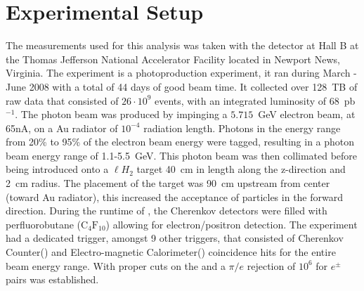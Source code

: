 \section{Experimental Setup}\label{sec:setup}
	The measurements used for this analysis was taken with the  detector at Hall B at the Thomas Jefferson National Accelerator Facility  located in 
	Newport News, Virginia. The  experiment is a photoproduction experiment, it ran during March - June 2008 with a total of 44 days of good beam time. It collected over 
	128~TB of raw data that consisted of $26\cdot 10^9$ events, with an integrated luminosity of 68~pb$^{-1}$. The photon beam was produced by impinging a $5.715$~GeV 
	electron beam, at 65nA, on a Au radiator of $10^{-4}$ radiation length. Photons in the energy range from 20\% to 95\% of the electron beam
	energy were tagged, resulting in a photon beam energy range of 1.1-5.5~GeV. This photon beam was then collimated before being introduced onto a $\ell H_2$ target 40~cm in 
	length along the z-direction and 2~cm radius. The placement of the target was 90~cm upstream from  center (toward Au radiator), this increased the acceptance 
	of particles in the forward direction. During the runtime of , the Cherenkov detectors were filled with perfluorobutane ($\mathrm{C_4F_{10}}$) allowing for electron/positron 
	detection. The experiment had a dedicated trigger, amongst 9 other triggers, that consisted of Cherenkov Counter() and Electro-magnetic Calorimeter() 
	coincidence hits for the entire beam energy range. With proper cuts on the  and  a $\pi/e$ rejection of $10^6$ for $e^{\pm}$ pairs was established.
